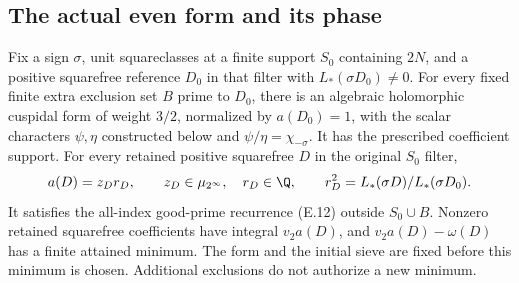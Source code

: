\subsection{The actual even form and its phase}
\begin{proposition}\label{ex:app-even-phase}
Fix a sign $\sigma$, unit squareclasses at a finite support $S_0$
containing $2N$, and a positive squarefree reference $D_0$ in that
filter with $L_*(\sigma D_0)\ne0$. For every fixed finite extra
exclusion set $B$ prime to $D_0$, there is an algebraic holomorphic
cuspidal form of weight $3/2$, normalized by $a(D_0)=1$, with the
scalar characters $\psi,\eta$ constructed below and
$\psi/\eta=\chi_{-\sigma}$. It has the prescribed coefficient
support. For every retained positive squarefree $D$ in the original
$S_0$ filter,
\[
 a(D)=z_Dr_D,\qquad z_D\in\mu_{2^\infty},\quad r_D\in\Q,
 \qquad r_D^2=L_*(\sigma D)/L_*(\sigma D_0).
\]
It satisfies the all-index good-prime recurrence (E.12) outside
$S_0\cup B$. Nonzero retained squarefree coefficients have integral
$v_2a(D)$, and $v_2a(D)-\omega(D)$ has a finite attained minimum.
The form and the initial sieve are fixed before this minimum is
chosen. Additional exclusions do not authorize a new minimum.
\end{proposition}
